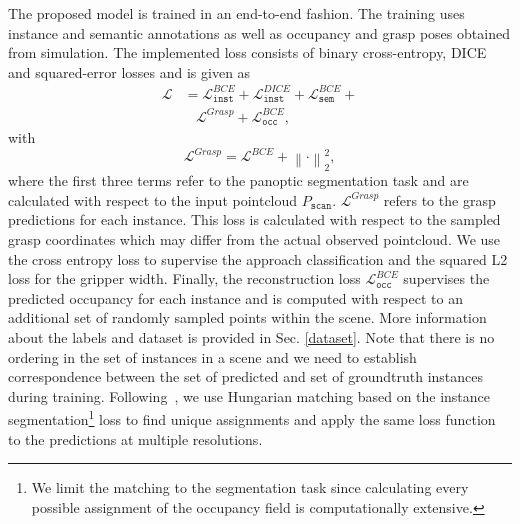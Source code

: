 \documentclass[letterpaper, 10 pt, conference]{ieeeconf}  %
\newcommand{\rene}[1]{\textcolor{OliveGreen}{R: #1}}
\begin{document}
The proposed model is trained in an end-to-end fashion. The training uses instance and semantic annotations as well as occupancy and grasp poses obtained from simulation.
The implemented loss consists of binary cross-entropy, DICE and squared-error losses and is given as
\begin{equation}
\begin{split}
    \mathcal{L} &=  \mathcal{L}_\mathtt{inst}^{BCE} +  \mathcal{L}_\mathtt{inst}^{DICE} + 
    \mathcal{L}_\mathtt{sem}^{BCE} + \\ 
  &\ \ \ \ 
    \mathcal{L}^{Grasp} + \mathcal{L}_\mathtt{occ}^{BCE},
\label{eq:full-loss}
\end{split}
\end{equation} 
with\vspace{-4mm}
\begin{equation}
    \mathcal{L}^{Grasp} = \mathcal{L}^{BCE} + \left\|\cdot \right\|_2^2,
\end{equation}
where the first three terms refer to the panoptic segmentation task and are calculated with respect to the input pointcloud $P_\mathtt{scan}$. $\mathcal{L}^{Grasp}$ refers to the grasp predictions for each instance. This loss is calculated with respect to the sampled grasp coordinates which may differ from the actual observed pointcloud. We use the cross entropy loss to supervise the approach classification and the squared L2 loss for the gripper width. Finally, the reconstruction loss $\mathcal{L}_\mathtt{occ}^{BCE}$ supervises the predicted occupancy for each instance and is computed with respect to an additional set of randomly sampled points within the scene. More information about the labels and dataset is provided in Sec. \ref{dataset}.
%
Note that there is no ordering in the set of instances in a scene and we need to establish correspondence between the set of predicted and set of groundtruth instances during training.
Following~\cite{schult2022mask3d}, we use Hungarian matching based on the instance segmentation\footnote{We limit the matching to the segmentation task since calculating every possible assignment of the occupancy field is computationally extensive.} loss to find unique assignments and apply the same loss function to the predictions at multiple resolutions.
\end{document}
